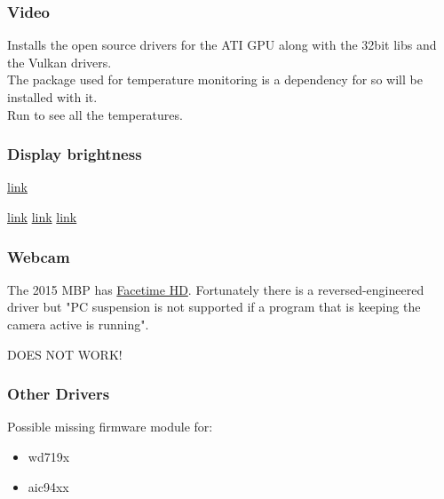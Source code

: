 \subsubsection{Video}
\begin{blocksection}
    Installs the open source drivers for the ATI GPU along with the 32bit libs and the Vulkan drivers.\\
    The \href{https://wiki.archlinux.org/index.php/Lm_sensors}{} package used for temperature monitoring is a dependency for  so will be installed with it.\\
    Run  to see all the temperatures.
\end{blocksection}

\subsubsection{Display brightness}

\href{https://github.com/0xbb/apple_set_os.efi}{link}

\href{https://github.com/Dunedan/mbp-2016-linux/issues/38}{link}
\href{https://bugzilla.kernel.org/show_bug.cgi?id=105051#c37}{link}
\href{https://bugzilla.kernel.org/show_bug.cgi?id=105051#c39}{link}

\subsubsection{Webcam}

The 2015 MBP has \href{https://wiki.archlinux.org/index.php/MacBook#Facetime_HD}{Facetime HD}.
Fortunately there is a reversed-engineered driver but "PC suspension is not supported if a 
program that is keeping the camera active is running".

DOES NOT WORK!


\subsubsection{Other Drivers}

Possible missing firmware module for:
\begin{itemize}[noitemsep,topsep=0pt,leftmargin=*]
    \item wd719x
    \item aic94xx
\end{itemize}

